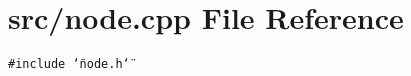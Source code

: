 \section{src/node.cpp File Reference}
\label{node_8cpp}
{\tt \#include \char`\"{}node.h\char`\"{}}\par
